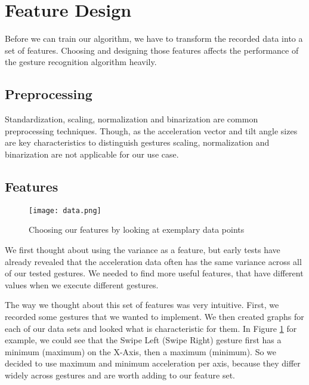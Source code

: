 \section{Feature Design}
\label{ch:DataCollection:sec:FeatureDesign}

Before we can train our algorithm, we  have to transform the recorded data into a set  of  features.
Choosing  and  designing  those  features  affects  the  performance  of  the gesture recognition algorithm heavily.

\subsection{Preprocessing}
\label{ch:DataCollection:sec:FeatureDesign:sub:Preprocessing}

Standardization,     scaling,     normalization     and     binarization     are     common preprocessing techniques.
Though, as the acceleration vector and tilt angle sizes are key characteristics  to  distinguish  gestures  scaling,  normalization  and  binarization  are  not applicable for our use case. 

\subsection{Features}
\label{ch:DataCollection:sec:FeatureDesign:sub:Features}

\begin{figure}
\begin{center}
  \texttt{[image: data.png]}
\caption{Choosing our features by looking at exemplary data points}\label{fig:datamining}
\end{center}
\end{figure} 

We  first  thought  about  using  the  variance  as  a  feature,  but  early  tests  have already revealed  that  the  acceleration  data  often  has  the same variance across all of our tested gestures. We needed to find more useful features, that have different values when we execute different gestures.

The way we thought about this set of features was very intuitive. First, we recorded some gestures that we wanted to implement.
We then created graphs for each of our data sets and looked what is characteristic for them.
In Figure \ref{fig:datamining} for example, we could see that the Swipe Left (Swipe Right) gesture first has a minimum (maximum) on the X-Axis, then a maximum (minimum).
So we decided to use maximum  and  minimum  acceleration  per  axis, because they  differ  widely  across gestures  and  are  worth  adding  to  our  feature  set.

